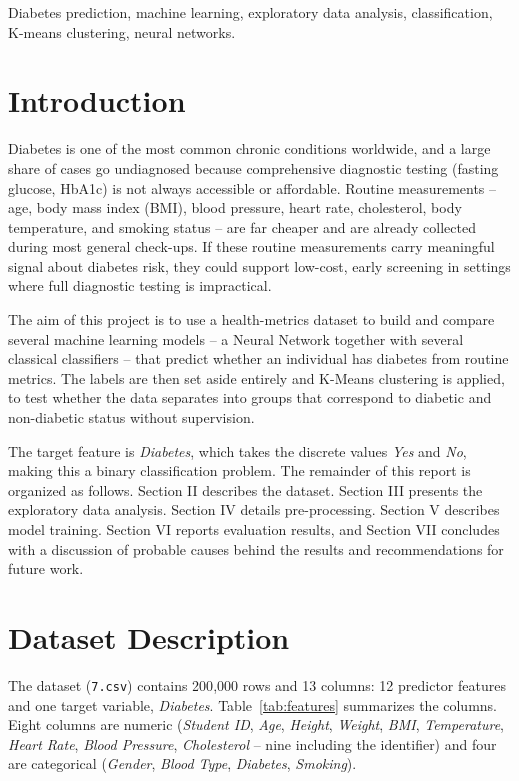 \documentclass[journal]{IEEEtran}
\begin{document}
\begin{IEEEkeywords}
Diabetes prediction, machine learning, exploratory data analysis, classification, K-means clustering, neural networks.
\end{IEEEkeywords}

\section{Introduction}
Diabetes is one of the most common chronic conditions worldwide, and a large share of cases go undiagnosed because comprehensive diagnostic testing (fasting glucose, HbA1c) is not always accessible or affordable. Routine measurements -- age, body mass index (BMI), blood pressure, heart rate, cholesterol, body temperature, and smoking status -- are far cheaper and are already collected during most general check-ups. If these routine measurements carry meaningful signal about diabetes risk, they could support low-cost, early screening in settings where full diagnostic testing is impractical.

The aim of this project is to use a health-metrics dataset to build and compare several machine learning models -- a Neural Network together with several classical classifiers -- that predict whether an individual has diabetes from routine metrics. The labels are then set aside entirely and K-Means clustering is applied, to test whether the data separates into groups that correspond to diabetic and non-diabetic status without supervision.

The target feature is \textit{Diabetes}, which takes the discrete values \textit{Yes} and \textit{No}, making this a binary classification problem. The remainder of this report is organized as follows. Section II describes the dataset. Section III presents the exploratory data analysis. Section IV details pre-processing. Section V describes model training. Section VI reports evaluation results, and Section VII concludes with a discussion of probable causes behind the results and recommendations for future work.

\section{Dataset Description}
The dataset (\texttt{7.csv}) contains 200{,}000 rows and 13 columns: 12 predictor features and one target variable, \textit{Diabetes}. Table~\ref{tab:features} summarizes the columns. Eight columns are numeric (\textit{Student ID}, \textit{Age}, \textit{Height}, \textit{Weight}, \textit{BMI}, \textit{Temperature}, \textit{Heart Rate}, \textit{Blood Pressure}, \textit{Cholesterol} -- nine including the identifier) and four are categorical (\textit{Gender}, \textit{Blood Type}, \textit{Diabetes}, \textit{Smoking}).
\end{document}
